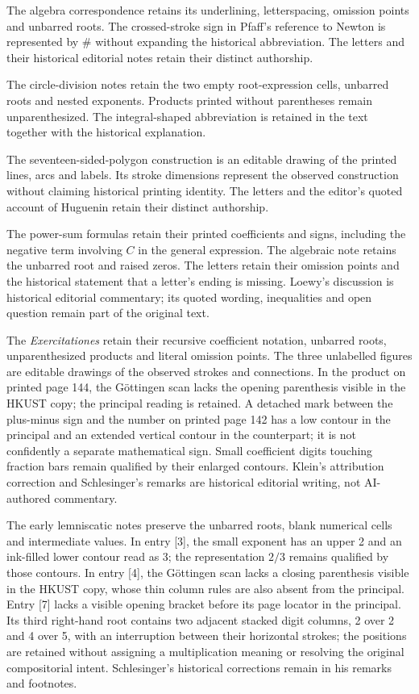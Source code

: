 The algebra correspondence retains its underlining, letterspacing, omission points and unbarred roots. The crossed-stroke sign in Pfaff’s reference to Newton is represented by \# without expanding the historical abbreviation. The letters and their historical editorial notes retain their distinct authorship.

The circle-division notes retain the two empty root-expression cells, unbarred roots and nested exponents. Products printed without parentheses remain unparenthesized. The integral-shaped abbreviation is retained in the text together with the historical explanation.

The seventeen-sided-polygon construction is an editable drawing of the printed lines, arcs and labels. Its stroke dimensions represent the observed construction without claiming historical printing identity. The letters and the editor’s quoted account of Huguenin retain their distinct authorship.

The power-sum formulas retain their printed coefficients and signs, including the negative term involving $C$ in the general expression. The algebraic note retains the unbarred root and raised zeros. The letters retain their omission points and the historical statement that a letter’s ending is missing. Loewy’s discussion is historical editorial commentary; its quoted wording, inequalities and open question remain part of the original text.

The \textit{Exercitationes} retain their recursive coefficient notation, unbarred roots, unparenthesized products and literal omission points. The three unlabelled figures are editable drawings of the observed strokes and connections. In the product on printed page 144, the Göttingen scan lacks the opening parenthesis visible in the HKUST copy; the principal reading is retained. A detached mark between the plus-minus sign and the number on printed page 142 has a low contour in the principal and an extended vertical contour in the counterpart; it is not confidently a separate mathematical sign. Small coefficient digits touching fraction bars remain qualified by their enlarged contours. Klein’s attribution correction and Schlesinger’s remarks are historical editorial writing, not AI-authored commentary.

The early lemniscatic notes preserve the unbarred roots, blank numerical cells and intermediate values. In entry [3], the small exponent has an upper 2 and an ink-filled lower contour read as 3; the representation $2/3$ remains qualified by those contours. In entry [4], the Göttingen scan lacks a closing parenthesis visible in the HKUST copy, whose thin column rules are also absent from the principal. Entry [7] lacks a visible opening bracket before its page locator in the principal. Its third right-hand root contains two adjacent stacked digit columns, 2 over 2 and 4 over 5, with an interruption between their horizontal strokes; the positions are retained without assigning a multiplication meaning or resolving the original compositorial intent. Schlesinger’s historical corrections remain in his remarks and footnotes.

